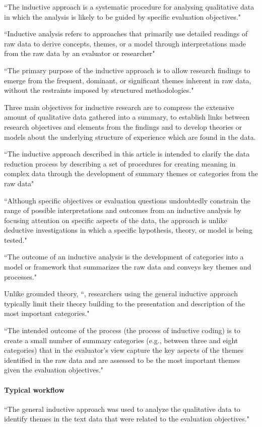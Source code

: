 ``The inductive approach is a systematic procedure for analysing qualitative data in which the analysis is likely to be guided by specific evaluation objectives."

``Inductive analysis refers to approaches that primarily use detailed readings of raw data to derive concepts, themes, or a model through interpretations made from the raw data by an evaluator or researcher"

``The primary purpose of the inductive approach is to allow research findings to emerge from the frequent, dominant, or significant themes inherent in raw data, without the restraints imposed by structured methodologies."

Three main objectives for inductive research are to compress the extensive amount of qualitative data gathered into a summary, to establish links between research objectives and elements from the findings and to develop theories or models about the underlying structure of experience which are found in the data\cite{thomas2006general}. 

``The inductive approach described in this article is intended to clarify the data reduction process by describing a set of procedures for creating meaning in complex data through the development of summary themes or categories from the raw data"

``Although specific objectives or evaluation questions undoubtedly constrain the range of possible interpretations and outcomes from an inductive analysis by focusing attention on specific aspects of the data, the approach is unlike deductive investigations in which a specific hypothesis, theory, or model is being tested."

``The outcome of an inductive analysis is the development of categories into a model or framework that summarizes the raw data and conveys key themes and processes."

Unlike grounded theory, ``, researchers using the general inductive approach typically limit their theory building to the presentation and description of the most important categories."

``The intended outcome of the process (the process of inductive coding) is to create a small number of summary categories (e.g., between three and eight categories) that in the evaluator’s view capture the key aspects of the themes identified in the raw data and are assessed to be the most important themes given the evaluation objectives."

\paragraph{Typical workflow}
``The general inductive approach was used to analyze the qualitative data to identify themes in the text data that were related to the evaluation objectives."

